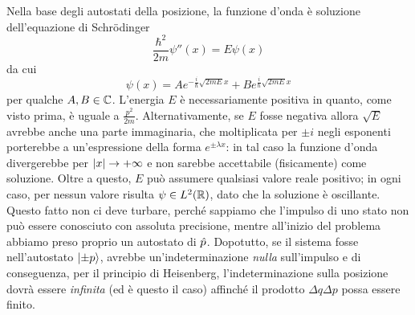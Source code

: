 Nella base degli autostati della posizione, la funzione d'onda è soluzione dell'equazione di Schr\"odinger
\begin{equation}
	\frac{\hbar^2}{2m}\psi''(x)=E\psi(x)
	\label{eq:schrodinger-particella-libera}
\end{equation}
da cui
\begin{equation}
	\psi(x)=Ae^{-\frac{i}{\hbar}\sqrt{2mE}x}+Be^{\frac{i}{\hbar}\sqrt{2mE}x}
	\label{eq:wf-particella-libera}
\end{equation}
per qualche $A,B\in\C$.
L'energia $E$ è necessariamente positiva in quanto, come visto prima, è uguale a $\frac{p^2}{2m}$.
Alternativamente, se $E$ fosse negativa allora $\sqrt{E}$ avrebbe anche una parte immaginaria, che moltiplicata per $\pm i$ negli esponenti porterebbe a un'espressione della forma $e^{\pm\lambda x}$: in tal caso la funzione d'onda divergerebbe per $\abs{x}\to+\infty$ e non sarebbe accettabile (fisicamente) come soluzione.
Oltre a questo, $E$ può assumere qualsiasi valore reale positivo; in ogni caso, per nessun valore risulta $\psi\in \leb[2]{\R}$, dato che la soluzione è oscillante.
Questo fatto non ci deve turbare, perch\'e sappiamo che l'impulso di uno stato non può essere conosciuto con assoluta precisione, mentre all'inizio del problema abbiamo preso proprio un autostato di $\op p$.
Dopotutto, se il sistema fosse nell'autostato $\ket{\pm p}$, avrebbe un'indeterminazione \emph{nulla} sull'impulso e di conseguenza, per il principio di Heisenberg, l'indeterminazione sulla posizione dovrà essere \emph{infinita} (ed è questo il caso) affinch\'e il prodotto $\Delta q\Delta p$ possa essere finito.

